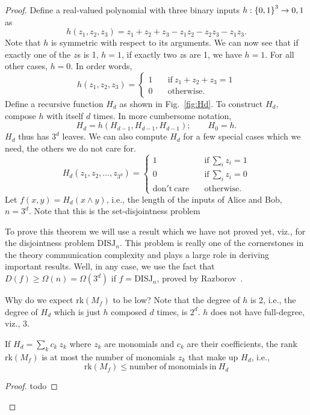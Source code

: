 \documentclass[usletter]{article}
\providecommand\cbrac[1]{\ensuremath \left\{#1\right\}}
\providecommand{\aand}{\wedge}
\newcommand{\rk}{\mathrm{rk}}
\newcommand{\mf}{M_f}
\newcommand{\df}{D(f)}
\newcommand{\DISJ}{\mathrm{DISJ}}
\newcommand{\pc}[2]{{\color{brown} #1}\marginpar{\tiny\noindent{\raggedright{\color{ForestGreen}[PC]}\color{brown}{ #2} \par}}}
\newcommand{\todo}[1]{{\color{gray}#1}\marginpar{\tiny\noindent{\raggedright{\color{ForestGreen}[MILD TODO]}}}}
\begin{document}
\begin{proof}
Define a real-valued polynomial with three binary inputs $h : \cbrac{0,1}^3 \to {0,1}$ as
$$
h(z_1, z_2, z_3) = z_1 + z_2 + z_3 - z_1 z_2 - z_2 z_3 - z_1 z_3.
$$
Note that $h$ is symmetric with respect to its arguments. We can now see that if exactly one of the $z$s is 1, $h = 1$, if exactly two $z$s are 1, we have $h = 1$. For all other cases, $h = 0$. In order words,
$$
h(z_1, z_2, z_3) = 
\begin{cases}
1 & \quad \mathrm{if}\ z_1 + z_2 + z_3 = 1\\
0 & \quad \mathrm{otherwise}.
\end{cases}
$$
Define a recursive function $H_d$ as shown in Fig.~\ref{fig:Hd}. To construct $H_d$, compose $h$ with itself $d$ times. In more cumbersome notation,
$$
H_d = h(H_{d-1}, H_{d-1}, H_{d-1}); \qquad H_0 = h.
$$
$H_d$ thus has $3^d$ leaves. We can also compute $H_d$ for a few special cases which we need, the others we do not care for.
$$
H_d(z_1, z_2, \ldots, z_{3^d}) =
\begin{cases}
1 & \quad \mathrm{if}\ \sum_{i} z_i = 1\\
0 & \quad \mathrm{if}\ \sum_{i} z_i = 0\\
\mathrm{don't\ care} & \quad \mathrm{otherwise}.
\end{cases}
$$
Let $f(x,y) = H_d(x \aand y)$, i.e., the length of the inputs of Alice and Bob, $n = 3^d$. \pc{Note that this is the set-disjointness problem}{}

To prove this theorem we will use a result which we have not proved yet, viz., for the disjointness problem $\DISJ_n$. This problem is really one of the cornerstones in the theory communication complexity and plays a large role in deriving important results. Well, in any case, we use the fact that $\df \geq \Omega(n) = \Omega(3^d)$ if $f = \DISJ_n$, proved by Razborov~\cite{razborov1992distributional}.

Why do we expect $\rk (\mf)$ to be low? Note that the degree of $h$ is 2, i.e., the degree of $H_d$ which is just $h$ composed $d$ times, is $2^d$. $h$ does not have full-degree, viz., 3.

\begin{proposition}
If $H_d = \sum_k c_k\ z_k$ where $z_k$ are monomials and $c_k$ are their coefficients, the rank $\rk (\mf)$ is at most the number of monomials $z_k$ that make up $H_d$, i.e.,
$$
\rk (\mf) \leq \mathrm{number\ of\ monomials\ in}\ H_d
$$
\end{proposition}
\begin{proof}
\todo{todo}
\end{proof}


\end{proof}
\end{document}
